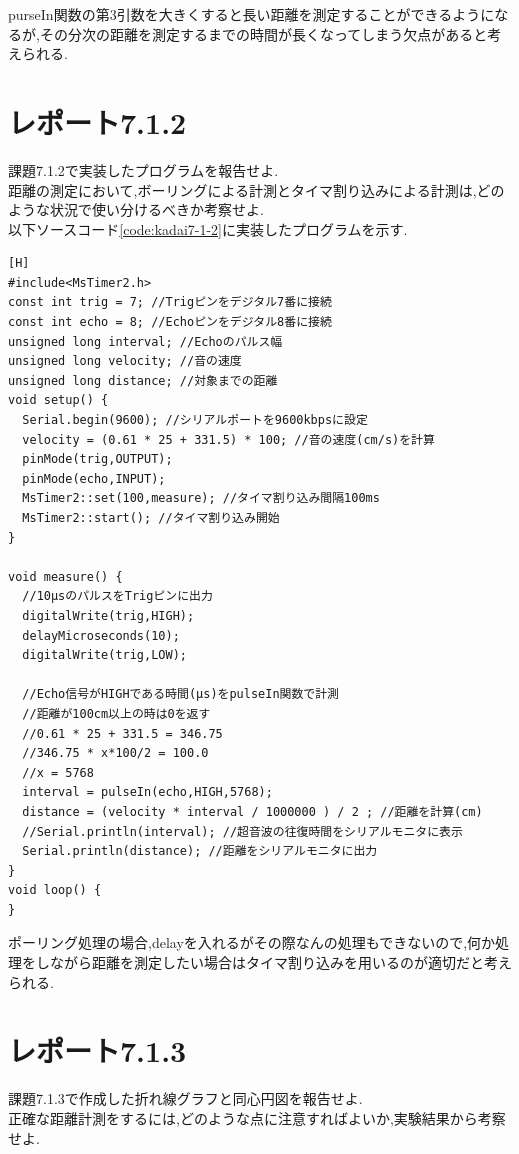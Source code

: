 \documentclass{jarticle}
\begin{document}
purseIn関数の第3引数を大きくすると長い距離を測定することができるようになるが,その分次の距離を測定するまでの時間が長くなってしまう欠点があると考えられる.

\section{レポート7.1.2}
課題7.1.2で実装したプログラムを報告せよ. \\
距離の測定において,ボーリングによる計測とタイマ割り込みによる計測は,どのような状況で使い分けるべきか考察せよ. \\


以下ソースコード\ref{code:kadai7-1-2}に実装したプログラムを示す.
\begin{lstlisting}[caption = 課題7.1.2,label=code:kadai7-1-2][H]
#include<MsTimer2.h>
const int trig = 7; //Trigピンをデジタル7番に接続
const int echo = 8; //Echoピンをデジタル8番に接続
unsigned long interval; //Echoのパルス幅
unsigned long velocity; //音の速度
unsigned long distance; //対象までの距離
void setup() {
  Serial.begin(9600); //シリアルポートを9600kbpsに設定
  velocity = (0.61 * 25 + 331.5) * 100; //音の速度(cm/s)を計算
  pinMode(trig,OUTPUT);
  pinMode(echo,INPUT);
  MsTimer2::set(100,measure); //タイマ割り込み間隔100ms
  MsTimer2::start(); //タイマ割り込み開始
}

void measure() {
  //10μsのパルスをTrigピンに出力
  digitalWrite(trig,HIGH);
  delayMicroseconds(10);
  digitalWrite(trig,LOW);

  //Echo信号がHIGHである時間(μs)をpulseIn関数で計測
  //距離が100cm以上の時は0を返す
  //0.61 * 25 + 331.5 = 346.75
  //346.75 * x*100/2 = 100.0
  //x = 5768 
  interval = pulseIn(echo,HIGH,5768); 
  distance = (velocity * interval / 1000000 ) / 2 ; //距離を計算(cm)
  //Serial.println(interval); //超音波の往復時間をシリアルモニタに表示
  Serial.println(distance); //距離をシリアルモニタに出力
}
void loop() {
}
\end{lstlisting}

ポーリング処理の場合,delayを入れるがその際なんの処理もできないので,何か処理をしながら距離を測定したい場合はタイマ割り込みを用いるのが適切だと考えられる.

\section{レポート7.1.3}
課題7.1.3で作成した折れ線グラフと同心円図を報告せよ. \\
正確な距離計測をするには,どのような点に注意すればよいか,実験結果から考察せよ. \\
\end{document}

